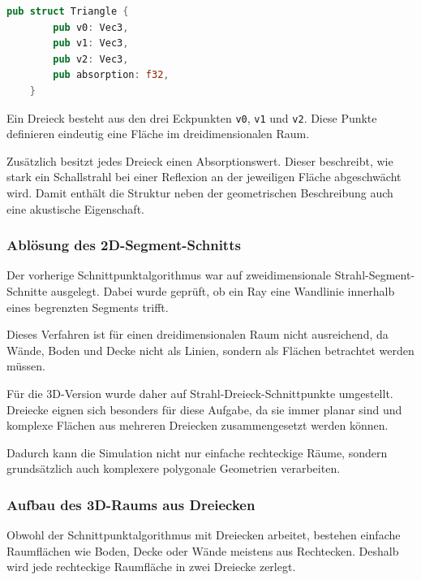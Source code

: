 \documentclass{article}
\begin{document}
    \begin{lstlisting}[language=Rust]
    pub struct Triangle {
        pub v0: Vec3,
        pub v1: Vec3,
        pub v2: Vec3,
        pub absorption: f32,
    }
    \end{lstlisting}

    Ein Dreieck besteht aus den drei Eckpunkten \texttt{v0}, \texttt{v1} und
    \texttt{v2}. Diese Punkte definieren eindeutig eine Fläche im
    dreidimensionalen Raum.

    Zusätzlich besitzt jedes Dreieck einen Absorptionswert. Dieser beschreibt, wie
    stark ein Schallstrahl bei einer Reflexion an der jeweiligen Fläche
    abgeschwächt wird. Damit enthält die Struktur neben der geometrischen
    Beschreibung auch eine akustische Eigenschaft.


    \subsubsection{Ablösung des 2D-Segment-Schnitts}
    \label{subsubsec:replace-2d-intersection}

    Der vorherige Schnittpunktalgorithmus war auf zweidimensionale
    Strahl-Segment-Schnitte ausgelegt. Dabei wurde geprüft, ob ein Ray eine
    Wandlinie innerhalb eines begrenzten Segments trifft.

    Dieses Verfahren ist für einen dreidimensionalen Raum nicht ausreichend, da
    Wände, Boden und Decke nicht als Linien, sondern als Flächen betrachtet werden
    müssen.

    Für die 3D-Version wurde daher auf Strahl-Dreieck-Schnittpunkte umgestellt.
    Dreiecke eignen sich besonders für diese Aufgabe, da sie immer planar sind und
    komplexe Flächen aus mehreren Dreiecken zusammengesetzt werden können.

    Dadurch kann die Simulation nicht nur einfache rechteckige Räume, sondern
    grundsätzlich auch komplexere polygonale Geometrien verarbeiten.


    \subsubsection{Aufbau des 3D-Raums aus Dreiecken}
    \label{subsubsec:room-triangles}

    Obwohl der Schnittpunktalgorithmus mit Dreiecken arbeitet, bestehen einfache
    Raumflächen wie Boden, Decke oder Wände meistens aus Rechtecken. Deshalb wird
    jede rechteckige Raumfläche in zwei Dreiecke zerlegt.
\end{document}
